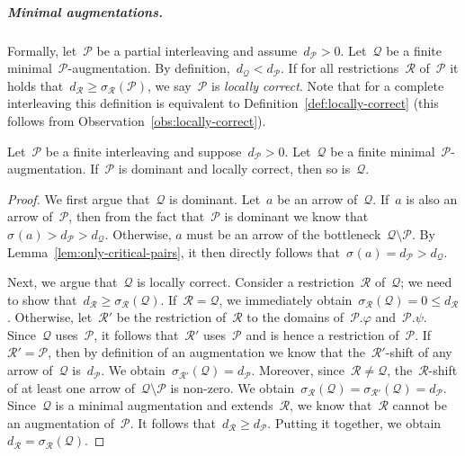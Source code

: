 \documentclass[a4paper,UKenglish, autoref, thm-restate, cleveref]{lipics-v2021}
\newcommand{\shift}[1]{\sigma_{#1}}
\newcommand{\resdist}[1]{d_{#1}}
\renewcommand{\phi}{\varphi}
\renewcommand{\P}{\mathcal{P}}
\newcommand{\Q}{\mathcal{Q}}
\newcommand{\R}{\mathcal{R}}
\begin{document}
\subparagraph{Minimal augmentations.}
Formally, let~$\mathcal{P}$ be a partial interleaving and assume~$\resdist{\P} > 0$.
Let~$\Q$ be a finite minimal~$\P$-augmentation.
By definition,~$\resdist{\Q} < \resdist{\P}$.
If for all restrictions~$\R$ of~$\P$ it holds that~$\resdist{\R} \ge \shift{\R}(\P)$, we say~$\P$ is \emph{locally correct}.
Note that for a complete interleaving this definition is equivalent to Definition~\ref{def:locally-correct} (this follows from Observation~\ref{obs:locally-correct}).
\begin{lemma}\label{lem:dominant-locally-correct}
Let~$\P$ be a finite interleaving and suppose~$\resdist{\P} > 0$.
Let~$\Q$ be a finite minimal~$\P$-augmentation.
If~$\P$ is dominant and locally correct, then so is~$\Q$.
\end{lemma}
\begin{proof}
    We first argue that~$\Q$ is dominant.
    Let~$a$ be an arrow of~$\Q$.
    If~$a$ is also an arrow of~$\P$, then from the fact that~$\P$ is dominant we know that~$\shift{}(a) > \resdist{\P} > \resdist{\Q}$.
    Otherwise, $a$ must be an arrow of the bottleneck~$\Q \setminus \P$.
    By Lemma~\ref{lem:only-critical-pairs}, it then directly follows that~$\shift{}(a) = \resdist{\P} > \resdist{\Q}$.

    Next, we argue that~$\Q$ is locally correct.
    Consider a restriction~$\R$ of~$\Q$; we need to show that~$\resdist{\R} \ge \shift{\R}(\Q)$.
    If~$\R = \Q$, we immediately obtain~$\shift{\R}(\Q) = 0 \le \resdist{\R}$.
    Otherwise, let~$\R'$ be the restriction of~$\R$ to the domains of~$\P.\phi$ and~$\P.\psi$.
    Since~$\Q$ uses~$\P$, it follows that~$\R'$ uses~$\P$ and is hence a restriction of~$\P$.
    If~$\R' = \P$, then by definition of an augmentation we know that the~$\R'$-shift of any arrow of~$\Q$ is~$\resdist{\P}$.
    We obtain~$\shift{\R'}(\Q) = \resdist{\P}$.
    Moreover, since~$\R \neq \Q$, the~$\R$-shift of at least one arrow of~$\Q \setminus \P$ is non-zero.
    We obtain~$\shift{\R}(\Q) = \shift{\R'}(\Q) = \resdist{\P}$.
    Since~$\Q$ is a minimal augmentation and extends~$\R$, we know that~$\R$ cannot be an augmentation of~$\P$.
    It follows that~$\resdist{\R} \ge \resdist{\P}$.
    Putting it together, we obtain~$\resdist{\R} = \shift{\R}(\Q)$.
    

\end{proof}
\end{document}

